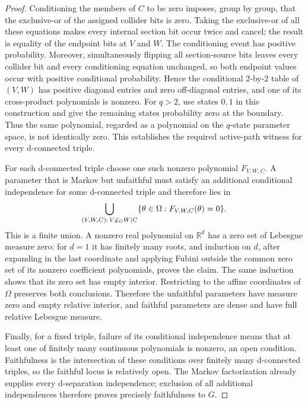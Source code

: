 \documentclass{article}
\begin{document}
\begin{proof}
Conditioning the members of \(C\) to be zero imposes, group by group, that the exclusive-or of the assigned collider bits is zero.  Taking the exclusive-or of all these equations makes every internal section bit occur twice and cancel; the result is equality of the endpoint bits at \(V\) and \(W\).  The conditioning event has positive probability.  Moreover, simultaneously flipping all section-source bits leaves every collider bit and every conditioning equation unchanged, so both endpoint values occur with positive conditional probability.  Hence the conditional \(2\)-by-\(2\) table of \((V,W)\) has positive diagonal entries and zero off-diagonal entries, and one of its cross-product polynomials is nonzero.  For \(q>2\), use states \(0,1\) in this construction and give the remaining states probability zero at the boundary.  Thus the same polynomial, regarded as a polynomial on the \(q\)-state parameter space, is not identically zero.  This establishes the required active-path witness for every d-connected triple.

For each d-connected triple choose one such nonzero polynomial \(F_{V,W,C}\).  A parameter that is Markov but unfaithful must satisfy an additional conditional independence for some d-connected triple and therefore lies in
\[
 \bigcup_{(V,W,C):\,V\not\!\perp_G W\mid C}
 \{\theta\in\Omega:F_{V,W,C}(\theta)=0\}.
\]
This is a finite union.  A nonzero real polynomial on \(\mathbb R^d\) has a zero set of Lebesgue measure zero: for \(d=1\) it has finitely many roots, and induction on \(d\), after expanding in the last coordinate and applying Fubini outside the common zero set of its nonzero coefficient polynomials, proves the claim.  The same induction shows that its zero set has empty interior.  Restricting to the affine coordinates of \(\Omega\) preserves both conclusions.  Therefore the unfaithful parameters have measure zero and empty relative interior, and faithful parameters are dense and have full relative Lebesgue measure.

Finally, for a fixed triple, failure of its conditional independence means that at least one of finitely many continuous polynomials is nonzero, an open condition.  Faithfulness is the intersection of these conditions over finitely many d-connected triples, so the faithful locus is relatively open.  The Markov factorization already supplies every d-separation independence; exclusion of all additional independences therefore proves precisely faithfulness to \(G\).
\end{proof}
\end{document}

